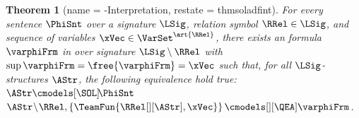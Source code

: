 \documentclass[authoryear]{elsarticle}
\newtheorem{theorem}{Theorem}
\begin{document}
\begin{theorem}[name = \SOL-\ADF Interpretation, restate = thmsoladfint]
  \label{thm:soladfint}
  For every \SOL sentence $\PhiSnt$ over a signature $\LSig$, relation symbol
  $\RRel \in \LSig$, and sequence of variables $\xVec \in
  \VarSet^{\art{\RRel}}$, there exists an \ADF formula $\varphiFrm$ in \pnf over
  signature $\LSig \setminus \RRel$ with $\sup{\varphiFrm} = \free{\varphiFrm} =
  \xVec$ such that, for all $\LSig$-structures $\AStr$, the following
  equivalence hold true: $\AStr \cmodels[\SOL]\! \PhiSnt$ \iff $\AStr
  \!\setminus\! \RRel, \left\{ \TeamFun{\RRel[][\AStr], \xVec} \right\}
  \cmodels[][\QEA] \varphiFrm$.
\end{theorem}

\end{document}
